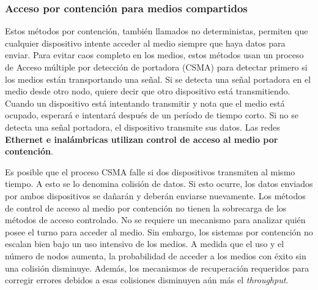\documentclass[a4paper]{article}
\begin{document}
	\noindent{}
	
	\subsubsection{Acceso por contención para medios compartidos}
	
	Estos métodos por contención, también llamados no deterministas, permiten que cualquier dispositivo intente acceder al medio siempre que haya datos para enviar. Para evitar caos completo en los medios, estos métodos usan un proceso de Acceso múltiple por detección de portadora (CSMA) para detectar primero si los medios están transportando una señal. Si se detecta una señal portadora en el medio desde otro nodo, quiere decir que otro dispositivo está transmitiendo. Cuando un dispositivo está intentando transmitir y nota que el medio está ocupado, esperará e intentará después de un período de tiempo corto. Si no se detecta una señal portadora, el dispositivo transmite sus datos. Las redes \textbf{Ethernet e inalámbricas utilizan control de acceso al medio por contención}.
	
	Es posible que el proceso CSMA falle si dos dispositivos transmiten al mismo tiempo. A esto se lo denomina colisión de datos. Si esto ocurre, los datos enviados por ambos dispositivos se dañarán y deberán enviarse nuevamente.   Los métodos de control de acceso al medio por contención no tienen la sobrecarga de los métodos de acceso controlado. No se requiere un mecanismo para analizar quién posee el turno para acceder al medio. Sin embargo, los sistemas por contención no escalan bien bajo un uso intensivo de los medios. A medida que el uso y el número de nodos aumenta, la probabilidad de acceder a los medios con éxito sin una colisión disminuye. Además, los mecanismos de recuperación requeridos para corregir errores debidos a esas colisiones disminuyen aún más el \textit{throughput}.
	
\end{document}
